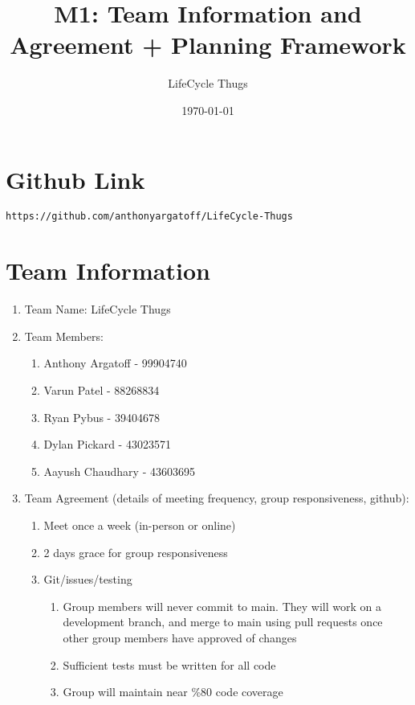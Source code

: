 \documentclass{article}
\title{M1: Team Information and Agreement + Planning Framework}
\author{LifeCycle Thugs}
\date{\today}
\begin{document}
\maketitle

\section*{Github Link}
\begin{verbatim}
https://github.com/anthonyargatoff/LifeCycle-Thugs
\end{verbatim}

\section*{Team Information}
\begin{enumerate}
    \item Team Name: LifeCycle Thugs
    \item Team Members:
        \begin{enumerate}
            \item Anthony Argatoff - 99904740
            \item Varun Patel - 88268834
            \item Ryan Pybus - 39404678
            \item Dylan Pickard - 43023571
            \item Aayush Chaudhary - 43603695
        \end{enumerate}
    \item Team Agreement (details of meeting frequency, group responsiveness, github):
        \begin{enumerate}
            \item Meet once a week (in-person or online)
            \item 2 days grace for group responsiveness
            \item Git/issues/testing
            \begin{enumerate}
                \item Group members will never commit to main. They will work on a development branch, and merge to main using pull requests once other group members have approved of changes
                \item Sufficient tests must be written for all code
                \item Group will maintain near \%80 code coverage
            \end{enumerate}
        \end{enumerate}

\end{enumerate}
\end{document}
